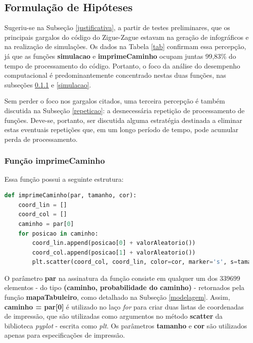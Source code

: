 \documentclass[12pt]{article}
\begin{document}
\subsection{Formulação de Hipóteses}
\label{hipoteses}


Sugeriu-se na Subseção \ref{justificativa}, a partir de testes preliminares, que os principais gargalos do código do Zigue-Zague estavam na geração de infográficos e na realização de simulações. Os dados na Tabela \ref{tab} confirmam essa percepção, já que as funções \textbf{simulacao} e \textbf{imprimeCaminho} ocupam juntas  99,83\% do tempo de processamento do código. Portanto, o foco da análise do desempenho computacional é predominantemente concentrado nestas duas funções, nas subseções \ref{imprime_caminho} e \ref{simulacao}.

Sem perder o foco nos gargalos citados, uma terceira percepção é também discutida na Subseção \ref{repeticao}: a desnecessária repetição de processamento de funções. Deve-se, portanto, ser discutida alguma estratégia destinada a eliminar estas eventuais repetições que, em um longo período de tempo, pode acumular perda de processamento.

\subsubsection{Função \textbf{imprimeCaminho}}
\label{imprime_caminho}

Essa função possui a seguinte estrutura:

\begin{lstlisting}[language=Python]
def imprimeCaminho(par, tamanho, cor):
	coord_lin = []
	coord_col = []
	caminho = par[0]
	for posicao in caminho:
		coord_lin.append(posicao[0] + valorAleatorio())
		coord_col.append(posicao[1] + valorAleatorio())
		plt.scatter(coord_col, coord_lin, color=cor, marker='s', s=tamanho)
\end{lstlisting}

O parâmetro \textbf{par} na assinatura da função consiste em qualquer um dos 339699 elementos - do tipo \textbf{(caminho, probabilidade do caminho)} - retornados pela função \textbf{mapaTabuleiro}, como detalhado na Subseção \ref{modelagem}. Assim, \textbf{caminho = par[0]} é utilizado no laço \textit{for} para criar duas listas de coordenadas de impressão, que são utilizadas como argumentos no método \textbf{scatter} da biblioteca \textit{pyplot} - escrita como \textit{plt}. Os parâmetros \textbf{tamanho} e \textbf{cor} são utilizados apenas para especificações de impressão.
\end{document}
